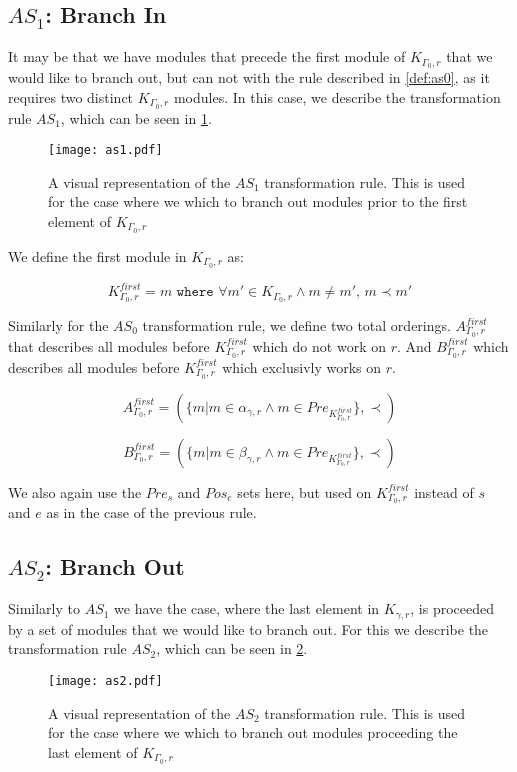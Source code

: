 \subsection{$AS_1$: Branch In}\label{sssec:bi}
It may be that we have modules that precede the first module of $K_{\Gamma_0 ,r}$ that we would like to branch out, but can not with the rule described in \cref{def:as0}, as it requires two distinct $K_{\Gamma_0 ,r}$ modules. In this case, we describe the transformation rule $AS_1$, which can be seen in \cref{fig:as1}.

\begin{figure}[H]
	\centering
	\texttt{[image: as1.pdf]}
	\caption{A visual representation of the $AS_1$ transformation rule. This is used for the case where we which to branch out modules prior to the first element of $K_{\Gamma_0 ,r}$}
	\label{fig:as1}
\end{figure}


 We define the first module in $K_{\Gamma_0 ,r}$ as:

\[K_{\Gamma_0 ,r}^{first} = m \texttt{ where } \forall m' \in K_{\Gamma_0 ,r} \land m \neq m',\, m \prec m' \] 

Similarly for the $AS_0$ transformation rule, we define two total orderings. $A_{\Gamma_0 ,r}^{first}$ that describes all modules before $K_{\Gamma_0 ,r}^{first}$ which do not work on $r$. And $B_{\Gamma_0 ,r}^{first}$ which describes all modules before $K_{\Gamma_0 ,r}^{first}$ which exclusivly works on $r$.

\[ A_{\Gamma_0 ,r}^{first} = (\{m | m \in \alpha_{\gamma ,r}  \land m \in Pre_{K_{\Gamma_0 ,r}^{first}} \}, \prec) \]

\[ B_{\Gamma_0 ,r}^{first} = (\{m | m \in \beta_{\gamma ,r}  \land m \in Pre_{K_{\Gamma_0 ,r}^{first}} \}, \prec) \]

We also again use the $Pre_s$ and $Pos_e$ sets here, but used on $K_{\Gamma_0 ,r}^{first}$ instead of $s$ and $e$ as in the case of the previous rule.
  

\subsection{$AS_2$: Branch Out}
Similarly to $AS_1$ we have the case, where the last element in $K_{\gamma ,r}$, is proceeded by a set of modules that we would like to branch out. For this we describe the transformation rule $AS_2$, which can be seen in \cref{fig:as2}.

\begin{figure}[H]
	\centering
	\texttt{[image: as2.pdf]}
	\caption{A visual representation of the $AS_2$ transformation rule. This is used for the case where we which to branch out modules proceeding the last element of $K_{\Gamma_0 ,r}$}
	\label{fig:as2}
\end{figure}


